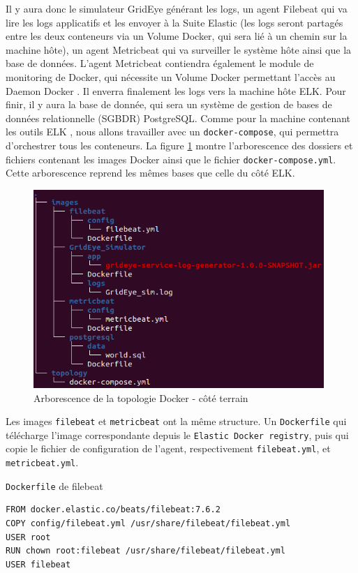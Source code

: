 \documentclass[paper=a4, fontsize=11pt]{scrartcl}
\begin{document}
Il y aura donc le simulateur GridEye générant les logs, un agent Filebeat qui va lire les logs applicatifs et les envoyer à la Suite Elastic (les logs seront partagés entre les deux conteneurs via un Volume Docker, qui sera lié à un chemin sur la machine hôte), un agent Metricbeat qui va surveiller le système hôte ainsi que la base de données. L'agent Metricbeat contiendra également le module de monitoring de Docker, qui nécessite un Volume Docker permettant l'accès au \og Daemon Docker \fg. Il enverra finalement les logs vers la machine hôte ELK. Pour finir, il y aura la base de donnée, qui sera un système de gestion de bases de données relationnelle (SGBDR) PostgreSQL.
Comme pour la machine contenant les outils \og ELK \fg, nous allons travailler avec un \verb,docker-compose,, qui permettra d'orchestrer tous les conteneurs. La figure \ref{f-treeDockerField} montre l'arborescence des dossiers et fichiers contenant les images Docker ainsi que le fichier \verb,docker-compose.yml,. Cette arborescence reprend les mêmes bases que celle du côté ELK.

\begin{figure}[H]
    \centering
    \includegraphics[width=11cm]{img/screenshots/tree_docker_field.png}
    \caption{Arborescence de la topologie Docker - côté terrain}
    \label{f-treeDockerField}
\end{figure}

Les images \verb,filebeat, et \verb,metricbeat, ont la même structure. Un \verb,Dockerfile, qui télécharge l'image correspondante depuis le \verb,Elastic Docker registry,, puis qui copie le fichier de configuration de l'agent, respectivement \verb,filebeat.yml,, et \verb,metricbeat.yml,.

\verb,Dockerfile, de filebeat
\begin{lstlisting}
FROM docker.elastic.co/beats/filebeat:7.6.2
COPY config/filebeat.yml /usr/share/filebeat/filebeat.yml
USER root
RUN chown root:filebeat /usr/share/filebeat/filebeat.yml
USER filebeat
\end{lstlisting}
\end{document}

